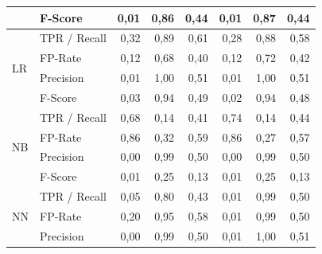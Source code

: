 \begin{table}
{\begin{tabular}{|ll|rrr|rrr|}
                     & F-Score      & 0,01             & 0,86                 & 0,44                     & 0,01             & 0,87                 & 0,44                      \\ 
\hline
\multirow{4}{*}{LR}  & TPR / Recall & 0,32             & 0,89                 & 0,61                     & 0,28             & 0,88                 & 0,58                      \\
                     & FP-Rate      & 0,12             & 0,68                 & 0,40                     & 0,12             & 0,72                 & 0,42                      \\
                     & Precision    & 0,01             & 1,00                 & 0,51                     & 0,01             & 1,00                 & 0,51                      \\
                     & F-Score      & 0,03             & 0,94                 & 0,49                     & 0,02             & 0,94                 & 0,48                      \\ 
\hline
\multirow{4}{*}{NB}  & TPR / Recall & 0,68             & 0,14                 & 0,41                     & 0,74             & 0,14                 & 0,44                      \\
                     & FP-Rate      & 0,86             & 0,32                 & 0,59                     & 0,86             & 0,27                 & 0,57                      \\
                     & Precision    & 0,00             & 0,99                 & 0,50                     & 0,00             & 0,99                 & 0,50                      \\
                     & F-Score      & 0,01             & 0,25                 & 0,13                     & 0,01             & 0,25                 & 0,13                      \\ 
\hline
\multirow{4}{*}{NN}  & TPR / Recall & 0,05             & 0,80                 & 0,43                     & 0,01             & 0,99                 & 0,50                      \\
                     & FP-Rate      & 0,20             & 0,95                 & 0,58                     & 0,01             & 0,99                 & 0,50                      \\
                     & Precision    & 0,00             & 0,99                 & 0,50                     & 0,01             & 1,00                 & 0,51                      \\

\end{tabular}}
\end{table}

